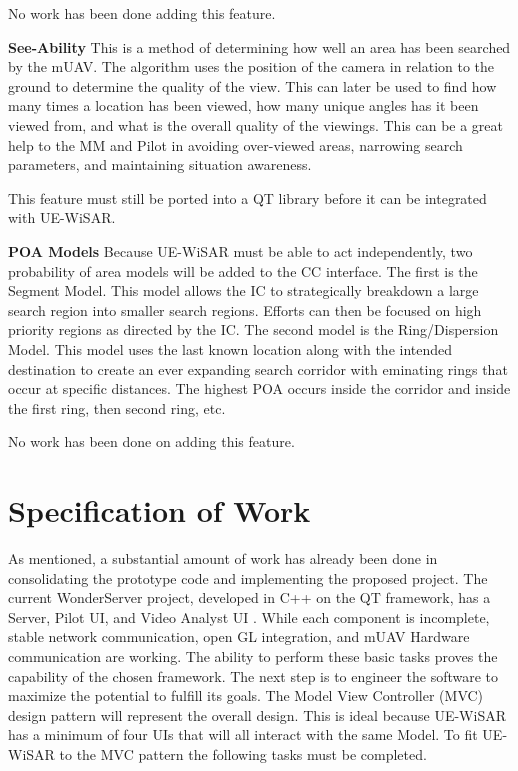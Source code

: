 \documentclass[12pt]{IEEEtran}
\begin{document}
No work has been done adding this feature.

\textbf{See-Ability}\cite{engh2008see}  This is a method of determining how well
an area has been searched by the mUAV.  The algorithm uses the position of the
camera in relation to the ground to determine the quality of the view.  This can
later be used to find how many times a location has been viewed, how many unique
angles has it been viewed from, and what is the overall quality of the viewings.
This can be a great help to the MM and Pilot in avoiding over-viewed areas,
narrowing search parameters, and maintaining situation awareness.

This feature must still be ported into a QT library before it can be integrated
with UE-WiSAR.

\textbf{POA Models}\cite{koester2008lostpersons}  Because UE-WiSAR must
be able to act independently, two probability of area models will be added
to the CC interface.  The first is the Segment Model.  This model allows the IC
to strategically breakdown a large search region into smaller search regions. 
Efforts can then be focused on high priority regions as directed by the IC.  The
second model is the Ring/Dispersion Model.  This model uses the last known
location along with the intended destination to create an ever expanding search
corridor with eminating rings that occur at specific distances.  The
highest POA occurs inside the corridor and inside the first ring, then second
ring, etc.

No work has been done on adding this feature.

\section{Specification of Work}
As mentioned, a substantial amount of work has already been done in
consolidating the prototype code and implementing the proposed project.  The
current WonderServer project, developed in C++ on the QT framework, has a
Server, Pilot UI, and Video Analyst UI \cite{uavCode, serverCode}.  While each
component is incomplete, stable network communication, open GL integration, and mUAV Hardware communication are working.  The ability
to perform these basic tasks proves the capability of the chosen framework.  The
next step is to engineer the software to maximize the potential to fulfill its
goals.  The Model View Controller (MVC) design pattern will represent the
overall design.  This is ideal because UE-WiSAR has a minimum of four UIs that will all
interact with the same Model.  To fit UE-WiSAR to the MVC pattern the following
tasks must be completed.
\end{document}
